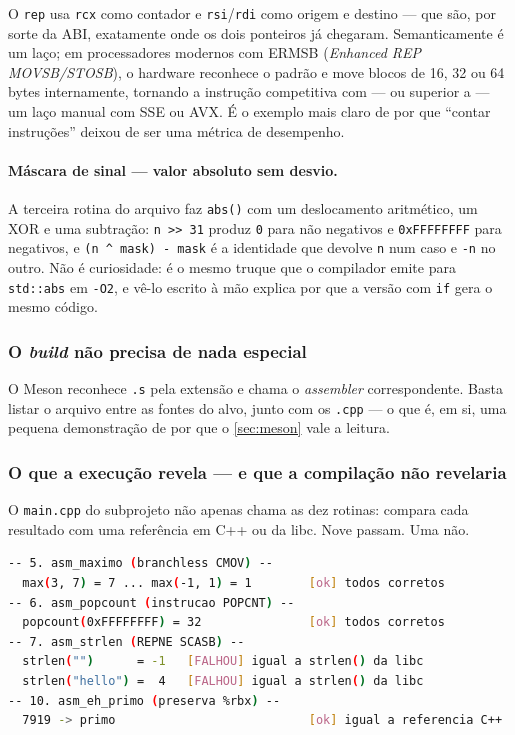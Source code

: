 O \texttt{rep} usa \texttt{rcx} como contador e \texttt{rsi}/\texttt{rdi} como
origem e destino --- que são, por sorte da ABI, exatamente onde os dois
ponteiros já chegaram. Semanticamente é um laço; em processadores modernos com
ERMSB (\emph{Enhanced REP MOVSB/STOSB}), o hardware reconhece o padrão e move
blocos de 16, 32 ou 64 bytes internamente, tornando a instrução competitiva com
--- ou superior a --- um laço manual com SSE ou AVX. É o exemplo mais claro de
por que ``contar instruções'' deixou de ser uma métrica de desempenho.

\paragraph{Máscara de sinal --- valor absoluto sem desvio.} A terceira rotina do
arquivo faz \texttt{abs()} com um deslocamento aritmético, um XOR e uma
subtração: \texttt{n >> 31} produz \texttt{0} para não negativos e
\texttt{0xFFFFFFFF} para negativos, e \texttt{(n \textasciicircum{} mask) - mask}
é a identidade que devolve \texttt{n} num caso e \texttt{-n} no outro. Não é
curiosidade: é o mesmo truque que o compilador emite para \texttt{std::abs} em
\texttt{-O2}, e vê-lo escrito à mão explica por que a versão com \texttt{if}
gera o mesmo código.

\subsubsection{O \emph{build} não precisa de nada especial}

O Meson reconhece \texttt{.s} pela extensão e chama o \emph{assembler}
correspondente. Basta listar o arquivo entre as fontes do alvo, junto com os
\texttt{.cpp} --- o que é, em si, uma pequena demonstração de por que o
\cref{sec:meson} vale a leitura.

\subsubsection{O que a execução revela --- e que a compilação não revelaria}

O \texttt{main.cpp} do subprojeto não apenas chama as dez rotinas: compara cada
resultado com uma referência em C++ ou da libc. Nove passam. Uma não.

\begin{lstlisting}[style=bt, language=bash,
    caption={Saída medida de \texttt{dist/bin/outline\_asm}, recortada.}]
-- 5. asm_maximo (branchless CMOV) --
  max(3, 7) = 7 ... max(-1, 1) = 1        [ok] todos corretos
-- 6. asm_popcount (instrucao POPCNT) --
  popcount(0xFFFFFFFF) = 32               [ok] todos corretos
-- 7. asm_strlen (REPNE SCASB) --
  strlen("")      = -1   [FALHOU] igual a strlen() da libc
  strlen("hello") =  4   [FALHOU] igual a strlen() da libc
-- 10. asm_eh_primo (preserva %rbx) --
  7919 -> primo                           [ok] igual a referencia C++
\end{lstlisting}


